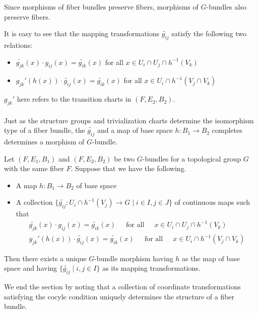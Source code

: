 \documentclass[a4paper]{article}
\begin{document}
Since morphisms of fiber bundles preserve fibers, morphisms of $G$-bundles also preserve fibers. 

It is easy to see that the mapping transformations $\widetilde{g_{ij}}$ satisfy the following two relations: 
\begin{itemize}
\item $\widetilde{g_{jk}}(x)\cdot g_{ij}(x)=\widetilde{g_{ik}}(x)$ for all $x\in U_i\cap U_j\cap h^{-1}(V_k)$
\item $g_{jk}'(h(x))\cdot\widetilde{g_{ij}}(x)=\widetilde{g_{ik}}(x)$ for all $x\in U_i\cap h^{-1}(V_j\cap V_k)$
\end{itemize}

$g_{jk}'$ here refers to the transition charts in $(F,E_2,B_2)$. \\~\\

Just as the structure groups and trivialization charts determine the isomorphism type of a fiber bundle, the $\widetilde{g_{ij}}$ and a map of base space $h:B_1\to B_2$ completes determines a morphism of $G$-bundle. 

\begin{thm}{}{} Let $(F,E_1,B_1)$ and $(F,E_2,B_2)$ be two $G$-bundles for a topological group $G$ with the same fiber $F$. Suppose that we have the following. 
\begin{itemize}
\item A map $h:B_1\to B_2$ of base space
\item A collection $\{\widetilde{g_{ij}}:U_i\cap h^{-1}(V_j)\to G\;|\;i\in I,j\in J\}$ of continuous maps such that \begin{gather*}
\widetilde{g_{jk}}(x)\cdot g_{ij}(x)=\widetilde{g_{ik}}(x)\;\;\;\;\text{ for all }\;\;\;\;x\in U_i\cap U_j\cap h^{-1}(V_k)\\
g_{jk}'(h(x))\cdot\widetilde{g_{ij}}(x)=\widetilde{g_{ik}}(x)\;\;\;\;\text{ for all }\;\;\;\;x\in U_i\cap h^{-1}(V_j\cap V_k)
\end{gather*}
\end{itemize}
Then there exists a unique $G$-bundle morphism having $h$ as the map of base space and having $\{\widetilde{g_{ij}}\;|\;i,j\in I\}$ as its mapping transformations. 
\end{thm}

We end the section by noting that a collection of coordinate transformations satisfying the cocyle condition uniquely determines the structure of a fiber bundle. 
\end{document}

